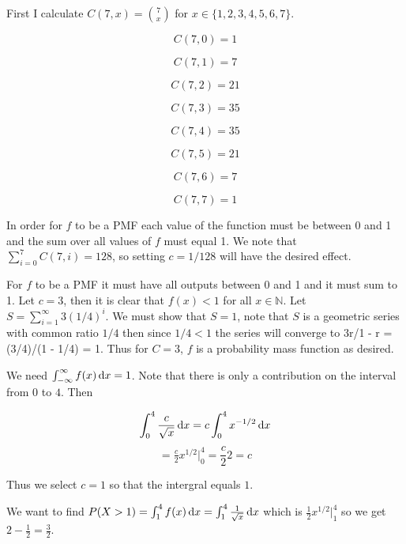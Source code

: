\documentclass[11pt,largemargins]{homework}
\newcommand{\N}{\mathbb{N}}
\begin{document}
\maketitle
\question 
First I calculate $C(7,x) = \binom{7}{x}$ for $x \in \{1,2,3,4,5,6,7\}$.

\[C(7,0) = 1 \]

\[C(7,1) = 7\]

\[C(7,2) = 21\]

\[C(7,3) = 35\]

\[C(7, 4) = 35\]

\[C(7,5) = 21\]

\[C(7,6) = 7\]

\[C(7,7) =1\]

In order for $f$ to be a PMF each value of the function must be between 0 and 1 and the sum over 
all values of $f$ must equal 1. We note that $\sum_{i = 0}^7 C(7,i) = 128$, so setting $c = 1/128$ will have the desired effect.



\newpage 

\question
For $f$ to be a PMF it must have all outputs between 0 and 1 and it must sum to 1. Let $c = 3$, then it is clear that 
$f(x) < 1$ for all $x \in \N$. Let $S = \sum_{i = 1}^\infty 3(1/4)^i$. We must show that $S = 1$, note that 
$S$ is a geometric series with common ratio $1/4$ then since $1/4 < 1$ the series will converge to 3r/1 - r = (3/4)/(1 - 1/4) = 1. 
Thus for $C = 3$, $f$ is a probability mass function as desired.

\newpage

\question
\begin{alphaparts}
    \questionpart 
    We need $\int_{-\infty}^{\infty} f(x) \dif x= 1$. Note that there is only a contribution on the interval from $0$ to $4$. Then 

    \[ \int_{0}^{4} \frac{c}{\sqrt{x}} \dif x = c \int_{0}^{4} x^{-1/2} \dif x \]
    \[ = \tfrac{c}{2} x^{1/2} \Big|_0^4 = \frac{c}{2}2 = c \]

    Thus we select $c = 1$ so that the intergral equals $1$. 

    \questionpart 
    We want to find $P(X > 1) = \int_{1}^4 f(x) \dif x = \int_{1}^4 \frac{1}{\sqrt{x}} \dif x$ which is 
    $ \tfrac{1}{2} x^{1/2} \Big|_1^4$ so we get $ 2 - \tfrac{1}{2} = \frac{3}{2}$. 
\end{alphaparts}

\newpage 
\end{document}
